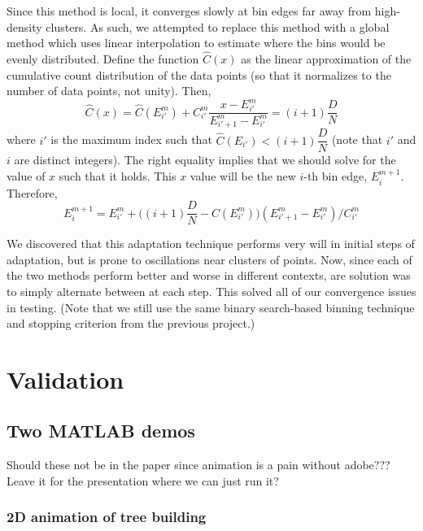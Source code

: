\documentclass{article}
\begin{document}
Since this method is local, it converges slowly at bin edges far away from high-density clusters. As such, we attempted to replace this method with a global method which uses linear interpolation to estimate where the bins would be evenly distributed. Define the function $\hat C(x)$ as the linear approximation of the cumulative count distribution of the data points (so that it normalizes to the number of data points, not unity). Then,
\begin{equation}
		\hat C(x) = \hat C(E^m_{i'}) + C^m_{i'} \dfrac{x - E^m_{i'}}{E^m_{{i'}+1} - E^m_{i'}} = (i+1) \dfrac{D}{N}
\end{equation}
where $i'$ is the maximum index such that $\hat C(E_{i'}) < (i+1) \dfrac{D}{N}$ (note that $i'$ and $i$ are distinct integers). The right equality implies that we should solve for the value of $x$ such that it holds. This $x$ value will be the new $i$-th bin edge, $E^{m+1}_i$. Therefore,
\begin{equation}
		E^{m+1}_i = E^m_{i'} + \bigg( (i+1) \dfrac{D}{N} - C(E^m_{i'}) \bigg) (E^m_{{i'}+1} - E^m_{i'}) / C^m_{i'}
\end{equation}

We discovered that this adaptation technique performs very will in initial steps of adaptation, but is prone to oscillations near clusters of points. Now, since each of the two methods perform better and worse in different contexts, are solution was to simply alternate between at each step. This solved all of our convergence issues in testing. (Note that we still use the same binary search-based binning technique and stopping criterion from the previous project.)





\section{Validation}


\subsection{Two MATLAB demos}
Should these not be in the paper since animation is a pain without adobe??? Leave it for the presentation where we can just run it?

\subsubsection{2D animation of tree building}
\end{document}
